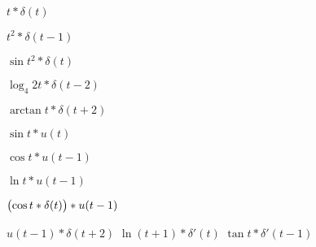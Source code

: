	\begin{multicols}{3}
		\begin{enumtasks}

			\item \( t * \delta(t) \)
			\item \( t^2 * \delta(t-1) \)
			\item \( \sin{t^2} * \delta(t) \)
			\item \( \log_4{2t} * \delta(t-2) \)
			\item \( \arctan{t} * \delta(t+2) \)
			\item \( \sin{t} * u(t) \)
			\item \( \cos{t} * u(t-1) \)
			\item \( \ln{t} * u(t-1) \)
			\item \( \bigl( \cos{t} * \delta(t) \bigr) * u(t-1) \)
			\item \( u(t-1) * \delta(t+2) \)
			\itemstar \( \ln(t+1) * \delta'(t) \)
			\itemstar \( \tan{t} * \delta'(t-1) \)

		\end{enumtasks}
	\end{multicols}






